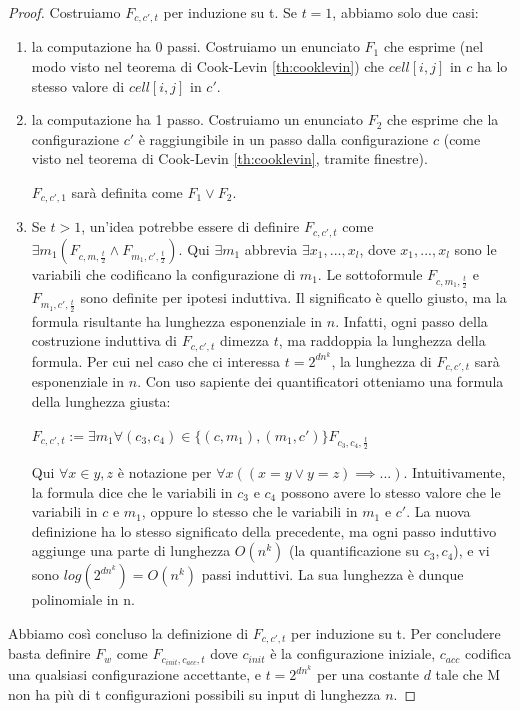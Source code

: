 \documentclass[a4paper, 12pt]{article}
\begin{document}
\begin{proof}
Costruiamo $F_{c,c',t}$ per induzione su t. Se $t=1$, abbiamo solo due casi:
\begin{enumerate}
\item la computazione ha 0 passi. Costruiamo un enunciato $F_1$ che esprime (nel modo visto nel teorema di Cook-Levin \ref{th:cooklevin}) che $cell[i,j]$ in $c$ ha lo stesso valore di $cell[i,j]$ in $c'$.
\item la computazione ha 1 passo. Costruiamo un enunciato $F_2$ che esprime che la configurazione $c'$ \`e raggiungibile in un passo dalla configurazione $c$ (come visto nel teorema di Cook-Levin \ref{th:cooklevin}, tramite finestre).
\begin{center}
$F_{c,c',1}$ sar\`a definita come $F_1 \lor F_2$.
\end{center}
\item Se $t > 1$, un'idea potrebbe essere di definire $F_{c,c',t}$ come $\exists m_1 (F_{c,m,\frac{t}{2}} \land F_{m_1, c', \frac{t}{2}})$. Qui $\exists m_1$ abbrevia $\exists x_1,...,x_l$, dove $x_1,...,x_l$ sono le variabili che codificano la configurazione di $m_1$. Le sottoformule $F_{c,m_1,\frac{t}{2}}$ e $F_{m_1,c',\frac{t}{2}}$ sono definite per ipotesi induttiva. Il significato \`e quello giusto, ma la formula risultante ha lunghezza esponenziale in $n$. Infatti, ogni passo della costruzione induttiva di $F_{c,c',t}$ dimezza $t$, ma raddoppia la lunghezza della formula. Per cui nel caso che ci interessa $t = 2^{dn^k}$, la lunghezza di $F_{c,c',t}$ sar\`a esponenziale in $n$. Con uso sapiente dei quantificatori otteniamo una formula della lunghezza giusta:
\begin{center}
$F_{c,c',t} := \exists m_1 \forall (c_3, c_4) \in \{(c,m_1),(m_1,c')\} F_{c_3,c_4,\frac{t}{2}}$
\end{center}
Qui $\forall x \in {y,z}$ \`e notazione per $\forall x ((x = y \lor y = z) \implies ...)$. Intuitivamente, la formula dice che le variabili in $c_3$ e $c_4$ possono avere lo stesso valore che le variabili in $c$ e $m_1$, oppure lo stesso che le variabili in $m_1$ e $c'$. La nuova definizione ha lo stesso significato della precedente, ma ogni passo induttivo aggiunge una parte di lunghezza $O(n^k)$ (la quantificazione su $c_3, c_4$), e vi sono $log(2^{dn^k}) = O(n^k)$ passi induttivi. La sua lunghezza \`e dunque polinomiale in n.
\end{enumerate}
Abbiamo cos\`i concluso la definizione di $F_{c,c',t}$ per induzione su t. Per concludere basta definire $F_w$ come $F_{c_{init}, c_{acc}, t}$ dove $c_{init}$ \`e la configurazione iniziale, $c_{acc}$ codifica una qualsiasi configurazione accettante, e $t = 2^{dn^k}$ per una costante $d$ tale che M non ha pi\`u di t configurazioni possibili su input di lunghezza $n$.
\end{proof}
\end{document}

